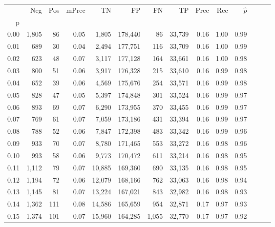 \begin{tabular}{rrrrrrrrrrrrrr}
\toprule
{} &    Neg &  Pos & mPrec &       TN &       FP &      FN &      TP &  Prec &   Rec & $\hat{p}$ \\
p    &        &      &       &          &          &         &         &       &       &           \\
\midrule
0.00 &  1,805 &   86 &  0.05 &    1,805 &  178,440 &      86 &  33,739 &  0.16 &  1.00 &      0.99 \\
0.01 &    689 &   30 &  0.04 &    2,494 &  177,751 &     116 &  33,709 &  0.16 &  1.00 &      0.99 \\
0.02 &    623 &   48 &  0.07 &    3,117 &  177,128 &     164 &  33,661 &  0.16 &  1.00 &      0.98 \\
0.03 &    800 &   51 &  0.06 &    3,917 &  176,328 &     215 &  33,610 &  0.16 &  0.99 &      0.98 \\
0.04 &    652 &   39 &  0.06 &    4,569 &  175,676 &     254 &  33,571 &  0.16 &  0.99 &      0.98 \\
0.05 &    828 &   47 &  0.05 &    5,397 &  174,848 &     301 &  33,524 &  0.16 &  0.99 &      0.97 \\
0.06 &    893 &   69 &  0.07 &    6,290 &  173,955 &     370 &  33,455 &  0.16 &  0.99 &      0.97 \\
0.07 &    769 &   61 &  0.07 &    7,059 &  173,186 &     431 &  33,394 &  0.16 &  0.99 &      0.97 \\
0.08 &    788 &   52 &  0.06 &    7,847 &  172,398 &     483 &  33,342 &  0.16 &  0.99 &      0.96 \\
0.09 &    933 &   70 &  0.07 &    8,780 &  171,465 &     553 &  33,272 &  0.16 &  0.98 &      0.96 \\
0.10 &    993 &   58 &  0.06 &    9,773 &  170,472 &     611 &  33,214 &  0.16 &  0.98 &      0.95 \\
0.11 &  1,112 &   79 &  0.07 &   10,885 &  169,360 &     690 &  33,135 &  0.16 &  0.98 &      0.95 \\
0.12 &  1,194 &   72 &  0.06 &   12,079 &  168,166 &     762 &  33,063 &  0.16 &  0.98 &      0.94 \\
0.13 &  1,145 &   81 &  0.07 &   13,224 &  167,021 &     843 &  32,982 &  0.16 &  0.98 &      0.93 \\
0.14 &  1,362 &  111 &  0.08 &   14,586 &  165,659 &     954 &  32,871 &  0.17 &  0.97 &      0.93 \\
0.15 &  1,374 &  101 &  0.07 &   15,960 &  164,285 &   1,055 &  32,770 &  0.17 &  0.97 &      0.92 \\

\end{tabular}
